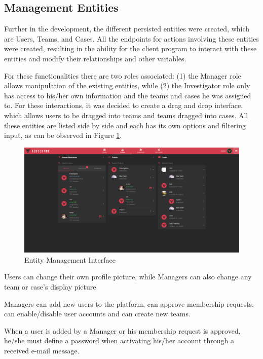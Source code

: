 \subsection{Management Entities}

Further in the development, the different persisted entities were created, which are Users, Teams, and Cases. All the endpoints for actions involving these 
entities were created, resulting in the ability for the client program to interact with these entities and modify their relationships and other variables.

For these functionalities there are two roles associated: (1) the Manager role allows manipulation of the existing entities, while (2) the Investigator role only has access to his/her
own information and the teams and cases he was assigned to. For these interactions, it was decided to create a drag and drop interface, which allows users to be dragged into
teams and teams dragged into cases. All these entities are listed side by side and each has its own options and filtering input, as can be observed in Figure \ref{fig:users}.

\begin{figure}[ht]
 \centering
 \includegraphics[width=1\linewidth]{imgs/users.png}
 \caption{Entity Management Interface}
 \label{fig:users}
\end{figure}

Users can change their own profile picture, while Managers can also change any team or case's display picture.

Managers can add new users to the platform, can approve membership requests, can enable/disable user accounts and can create new teams.

When a user is added by a Manager or his membership request is approved, he/she must define a password when activating his/her account through a received e-mail message.


